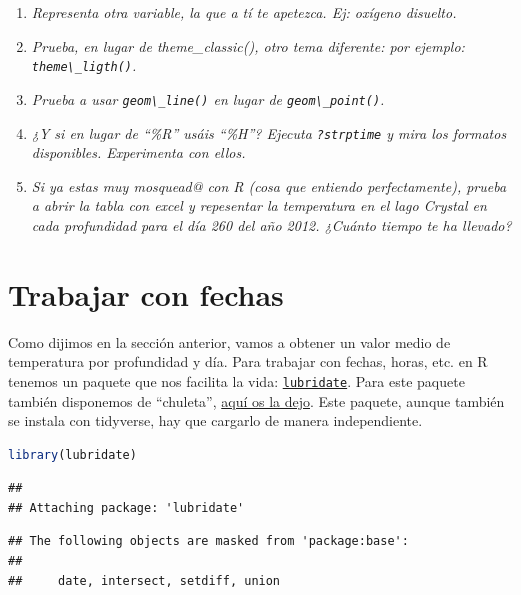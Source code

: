 \documentclass[
]{book}
\newcommand{\passthrough}[1]{#1}
\providecommand{\tightlist}{%
  \setlength{\itemsep}{0pt}\setlength{\parskip}{0pt}}
\begin{document}
\begin{enumerate}
\def\labelenumi{\arabic{enumi}.}
\tightlist
\item
  \emph{Representa otra variable, la que a tí te apetezca. Ej: oxígeno disuelto.}
\item
  \emph{Prueba, en lugar de theme\_classic(), otro tema diferente: por ejemplo: \passthrough{\lstinline!theme\_ligth()!}.}
\item
  \emph{Prueba a usar \passthrough{\lstinline!geom\_line()!} en lugar de \passthrough{\lstinline!geom\_point()!}.}
\item
  \emph{¿Y si en lugar de ``\%R'' usáis ``\%H''? Ejecuta \passthrough{\lstinline!?strptime!} y mira los formatos disponibles. Experimenta con ellos.}
\item
  \emph{Si ya estas muy mosquead@ con R (cosa que entiendo perfectamente), prueba a abrir la tabla con excel y repesentar la temperatura en el lago Crystal en cada profundidad para el día 260 del año 2012. ¿Cuánto tiempo te ha llevado?}
\end{enumerate}

\hypertarget{trabajar-con-fechas}{%
\section{Trabajar con fechas}\label{trabajar-con-fechas}}

Como dijimos en la sección anterior, vamos a obtener un valor medio de temperatura por profundidad y día. Para trabajar con fechas, horas, etc. en R tenemos un paquete que nos facilita la vida: \href{https://cran.r-project.org/web/packages/lubridate/lubridate.pdf}{\passthrough{\lstinline!lubridate!}}. Para este paquete también disponemos de ``chuleta'', \href{https://raw.githubusercontent.com/rstudio/cheatsheets/master/lubridate.pdf}{aquí os la dejo}. Este paquete, aunque también se instala con tidyverse, hay que cargarlo de manera independiente.

\begin{lstlisting}[language=R]
library(lubridate)
\end{lstlisting}

\begin{lstlisting}
## 
## Attaching package: 'lubridate'
\end{lstlisting}

\begin{lstlisting}
## The following objects are masked from 'package:base':
## 
##     date, intersect, setdiff, union
\end{lstlisting}
\end{document}
